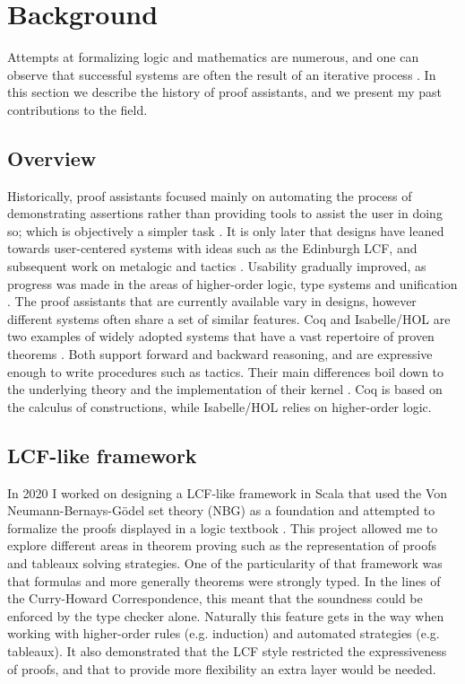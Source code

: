 \section{Background}
\label{sec:background}

Attempts at formalizing logic and mathematics are numerous, and one can observe that successful systems are often the result of an iterative process \cite{Paulson2019, Harrison2014}. In this section we describe the history of proof assistants, and we present my past contributions to the field.

\subsection{Overview}

Historically, proof assistants focused mainly on automating the process of demonstrating assertions rather than providing tools to assist the user in doing so; which is objectively a simpler task \cite{Harrison2014}. It is only later that designs have leaned towards user-centered systems with ideas such as the Edinburgh LCF, and subsequent work on metalogic and tactics \cite{Milner1984}. Usability gradually improved, as progress was made in the areas of higher-order logic, type systems and unification \cite{Paulson2019}. The proof assistants that are currently available vary in designs, however different systems often share a set of similar features. Coq and Isabelle/HOL are two examples of widely adopted systems that have a vast repertoire of proven theorems \cite{Yushkovskiy2018}. Both support forward and backward reasoning, and are expressive enough to write procedures such as tactics. Their main differences boil down to the underlying theory and the implementation of their kernel \cite{Barras1999, Wenzel2021}. Coq is based on the calculus of constructions, while Isabelle/HOL relies on higher-order logic.

\subsection{LCF-like framework}

In 2020 I worked on designing a LCF-like framework in Scala that used the Von Neumann-Bernays-Gödel set theory (NBG) as a foundation \cite{Cassayre2020} and attempted to formalize the proofs displayed in a logic textbook \cite{Mendelson2015}. This project allowed me to explore different areas in theorem proving such as the representation of proofs and tableaux solving strategies. One of the particularity of that framework was that formulas and more generally theorems were strongly typed. In the lines of the Curry-Howard Correspondence, this meant that the soundness could be enforced by the type checker alone. Naturally this feature gets in the way when working with higher-order rules (e.g. induction) and automated strategies (e.g. tableaux). It also demonstrated that the LCF style restricted the expressiveness of proofs, and that to provide more flexibility an extra layer would be needed.

